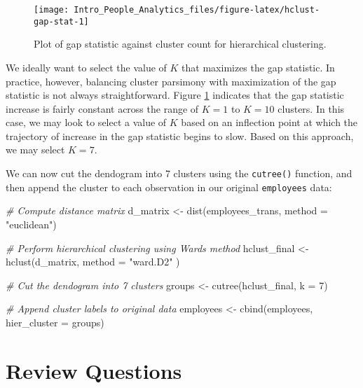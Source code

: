 \documentclass[
]{book}
\newenvironment{Shaded}{\begin{snugshade}}{\end{snugshade}}
\newcommand{\AttributeTok}[1]{\textcolor[rgb]{0.77,0.63,0.00}{#1}}
\newcommand{\CommentTok}[1]{\textcolor[rgb]{0.56,0.35,0.01}{\textit{#1}}}
\newcommand{\DecValTok}[1]{\textcolor[rgb]{0.00,0.00,0.81}{#1}}
\newcommand{\FunctionTok}[1]{\textcolor[rgb]{0.00,0.00,0.00}{#1}}
\newcommand{\NormalTok}[1]{#1}
\newcommand{\OtherTok}[1]{\textcolor[rgb]{0.56,0.35,0.01}{#1}}
\newcommand{\StringTok}[1]{\textcolor[rgb]{0.31,0.60,0.02}{#1}}
\begin{document}
\begin{figure}

{\centering \texttt{[image: Intro\_People\_Analytics\_files/figure-latex/hclust-gap-stat-1]} 

}

\caption{Plot of gap statistic against cluster count for hierarchical clustering.}\label{fig:hclust-gap-stat}
\end{figure}

We ideally want to select the value of \(K\) that maximizes the gap statistic. In practice, however, balancing cluster parsimony with maximization of the gap statistic is not always straightforward. Figure \ref{fig:hclust-gap-stat} indicates that the gap statistic increase is fairly constant across the range of \(K = 1\) to \(K = 10\) clusters. In this case, we may look to select a value of \(K\) based on an inflection point at which the trajectory of increase in the gap statistic begins to slow. Based on this approach, we may select \(K = 7\).

We can now cut the dendogram into 7 clusters using the \texttt{cutree()} function, and then append the cluster to each observation in our original \texttt{employees} data:

\begin{Shaded}
\begin{Highlighting}[]
\CommentTok{\# Compute distance matrix}
\NormalTok{d\_matrix }\OtherTok{\textless{}{-}} \FunctionTok{dist}\NormalTok{(employees\_trans, }\AttributeTok{method =} \StringTok{"euclidean"}\NormalTok{)}

\CommentTok{\# Perform hierarchical clustering using Ward\textquotesingle{}s method}
\NormalTok{hclust\_final }\OtherTok{\textless{}{-}} \FunctionTok{hclust}\NormalTok{(d\_matrix, }\AttributeTok{method =} \StringTok{"ward.D2"}\NormalTok{ )}

\CommentTok{\# Cut the dendogram into 7 clusters}
\NormalTok{groups }\OtherTok{\textless{}{-}} \FunctionTok{cutree}\NormalTok{(hclust\_final, }\AttributeTok{k =} \DecValTok{7}\NormalTok{)}

\CommentTok{\# Append cluster labels to original data}
\NormalTok{employees }\OtherTok{\textless{}{-}} \FunctionTok{cbind}\NormalTok{(employees, }\AttributeTok{hier\_cluster =}\NormalTok{ groups)}
\end{Highlighting}
\end{Shaded}

\hypertarget{review-questions-11}{%
\section{Review Questions}\label{review-questions-11}}
\end{document}
